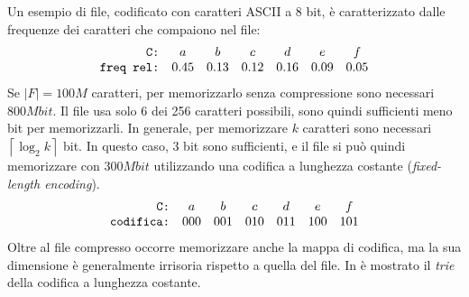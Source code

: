 Un esempio di file, codificato con caratteri ASCII a 8 bit, è caratterizzato dalle frequenze dei caratteri che compaiono nel file:
\begin{equation*}
    \begin{array}[H]{rcccccc}
        \texttt{C:} & a & b & c & d & e & f \\
        \texttt{freq rel:} & 0.45 & 0.13 & 0.12 & 0.16 & 0.09 & 0.05
    \end{array}
\end{equation*}
Se $|F| = 100M$ caratteri, per memorizzarlo senza compressione sono necessari $800 Mbit$. Il file usa solo 6 dei 256 caratteri possibili, sono quindi sufficienti meno bit per memorizzarli. In generale, per memorizzare $k$ caratteri sono necessari $\left\lceil \log_2 k \right\rceil$ bit. In questo caso, 3 bit sono sufficienti, e il file si può quindi memorizzare con $300 Mbit$ utilizzando una codifica a lunghezza costante (\emph{fixed-length encoding}).
\begin{equation*}
    \begin{array}[H]{rcccccc}
        \texttt{C:} & a & b & c & d & e & f \\
        \texttt{codifica:} & 000 & 001 & 010 & 011 & 100 & 101
    \end{array}
\end{equation*}
Oltre al file compresso occorre memorizzare anche la mappa di codifica, ma la sua dimensione è generalmente irrisoria rispetto a quella del file.
In  è mostrato il \emph{trie} della codifica a lunghezza costante.
